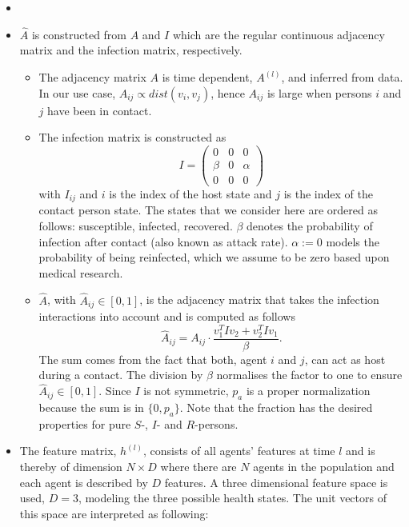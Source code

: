 \documentclass[]{article}
\begin{document}
\begin{itemize}
	\item {} 
	\item $\hat{A}$ is constructed from $A$ and $I$ which are the regular continuous adjacency matrix and the infection matrix, respectively.
	\begin{itemize}
		\item The adjacency matrix $A$ is time dependent, $A^{(l)}$, and inferred from data. In our use case, $A_{ij} \propto dist(v_i, v_j)$, hence $A_{ij}$ is large when persons $i$ and $j$ have been in contact.
		\item The infection matrix is constructed as
		\begin{equation}
			I =
			\begin{pmatrix}
				0     &  0  & 0 \\
				\beta &  0  & \alpha \\
				0     &  0  & 0
			\end{pmatrix}
		\end{equation}
		with $I_{ij}$ and $i$ is the index of the host state and $j$ is the index of the contact person state. The states that we consider here are ordered as follows: susceptible, infected, recovered. $\beta$ denotes the probability of infection  after contact (also known as attack rate). $\alpha := 0$ models the probability of being reinfected, which we assume to be zero based upon medical research.
		\item $\hat{A}$, with $\hat{A}_{ij}\in [0, 1]$, is the adjacency matrix that takes the infection interactions into account and is computed as follows
		\begin{equation}
			\hat{A}_{ij} = A_{ij}\cdot \frac{ v_1^T I v_2 + v_2^T I v_1 }{\beta}.
		\end{equation}
		The sum comes from the fact that both, agent $i$ and $j$, can act as host during a contact. The division by $\beta$ normalises the factor to one to ensure $\hat{A}_{ij} \in [0, 1]$. Since $I$ is not symmetric, $p_a$ is a proper normalization because the sum is in $\{0, p_a\}$. Note that the fraction has the desired properties for pure $S$-, $I$- and $R$-persons.
	\end{itemize}
	\item The feature matrix, $h^{(l)}$, consists of all agents' features at time $l$ and is thereby of dimension $N\times D$ where there are $N$ agents in the population and each agent is described by $D$ features. A three dimensional feature space is used, $D=3$, modeling the three possible health states. The unit vectors of this space are interpreted as following:

\end{itemize}
\end{document}
